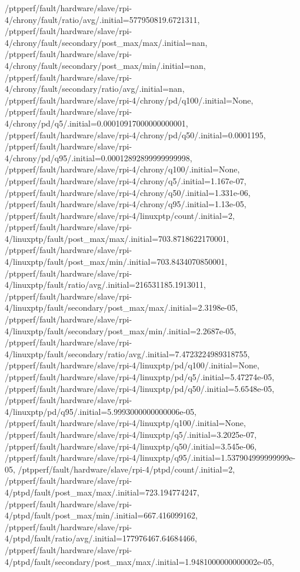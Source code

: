 {    /ptpperf/fault/hardware/slave/rpi-4/chrony/fault/ratio/avg/.initial=577950819.6721311,
    /ptpperf/fault/hardware/slave/rpi-4/chrony/fault/secondary/post_max/max/.initial=nan,
    /ptpperf/fault/hardware/slave/rpi-4/chrony/fault/secondary/post_max/min/.initial=nan,
    /ptpperf/fault/hardware/slave/rpi-4/chrony/fault/secondary/ratio/avg/.initial=nan,
    /ptpperf/fault/hardware/slave/rpi-4/chrony/pd/q100/.initial=None,
    /ptpperf/fault/hardware/slave/rpi-4/chrony/pd/q5/.initial=0.00010917000000000001,
    /ptpperf/fault/hardware/slave/rpi-4/chrony/pd/q50/.initial=0.0001195,
    /ptpperf/fault/hardware/slave/rpi-4/chrony/pd/q95/.initial=0.00012892899999999998,
    /ptpperf/fault/hardware/slave/rpi-4/chrony/q100/.initial=None,
    /ptpperf/fault/hardware/slave/rpi-4/chrony/q5/.initial=1.167e-07,
    /ptpperf/fault/hardware/slave/rpi-4/chrony/q50/.initial=1.331e-06,
    /ptpperf/fault/hardware/slave/rpi-4/chrony/q95/.initial=1.13e-05,
    /ptpperf/fault/hardware/slave/rpi-4/linuxptp/count/.initial=2,
    /ptpperf/fault/hardware/slave/rpi-4/linuxptp/fault/post_max/max/.initial=703.8718622170001,
    /ptpperf/fault/hardware/slave/rpi-4/linuxptp/fault/post_max/min/.initial=703.8434070850001,
    /ptpperf/fault/hardware/slave/rpi-4/linuxptp/fault/ratio/avg/.initial=216531185.1913011,
    /ptpperf/fault/hardware/slave/rpi-4/linuxptp/fault/secondary/post_max/max/.initial=2.3198e-05,
    /ptpperf/fault/hardware/slave/rpi-4/linuxptp/fault/secondary/post_max/min/.initial=2.2687e-05,
    /ptpperf/fault/hardware/slave/rpi-4/linuxptp/fault/secondary/ratio/avg/.initial=7.4723224989318755,
    /ptpperf/fault/hardware/slave/rpi-4/linuxptp/pd/q100/.initial=None,
    /ptpperf/fault/hardware/slave/rpi-4/linuxptp/pd/q5/.initial=5.47274e-05,
    /ptpperf/fault/hardware/slave/rpi-4/linuxptp/pd/q50/.initial=5.6548e-05,
    /ptpperf/fault/hardware/slave/rpi-4/linuxptp/pd/q95/.initial=5.9993000000000006e-05,
    /ptpperf/fault/hardware/slave/rpi-4/linuxptp/q100/.initial=None,
    /ptpperf/fault/hardware/slave/rpi-4/linuxptp/q5/.initial=3.2025e-07,
    /ptpperf/fault/hardware/slave/rpi-4/linuxptp/q50/.initial=3.545e-06,
    /ptpperf/fault/hardware/slave/rpi-4/linuxptp/q95/.initial=1.537904999999999e-05,
    /ptpperf/fault/hardware/slave/rpi-4/ptpd/count/.initial=2,
    /ptpperf/fault/hardware/slave/rpi-4/ptpd/fault/post_max/max/.initial=723.194774247,
    /ptpperf/fault/hardware/slave/rpi-4/ptpd/fault/post_max/min/.initial=667.416099162,
    /ptpperf/fault/hardware/slave/rpi-4/ptpd/fault/ratio/avg/.initial=177976467.64684466,
    /ptpperf/fault/hardware/slave/rpi-4/ptpd/fault/secondary/post_max/max/.initial=1.9481000000000002e-05,
}
